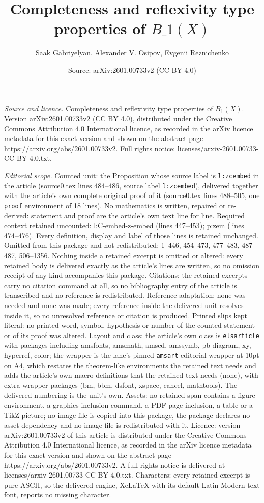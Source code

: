 \documentclass[10pt,a4paper]{amsart}
\title[Completeness and reflexivity type properties of $B\_1(X)$]{Completeness and reflexivity type properties of $B\_1(X)$}
\author{Saak Gabriyelyan, Alexander V. Osipov, Evgenii Reznichenko}
\date{Source: arXiv:2601.00733v2 (CC BY 4.0)}
\begin{document}
\maketitle

\noindent\emph{Source and licence.} Completeness and reflexivity type properties of $B_1(X)$. Version arXiv:2601.00733v2 (CC BY 4.0), distributed under the Creative Commons Attribution 4.0 International licence, as recorded in the arXiv licence metadata for this exact version and shown on the abstract page https://arxiv.org/abs/2601.00733v2. Full rights notice: licenses/arxiv-2601.00733-CC-BY-4.0.txt.\par\smallskip

\noindent\textit{Editorial scope.} Counted unit: the Proposition whose source label is \texttt{l:zcembed} in the article (source0.tex lines 484--486, source label \texttt{l:zcembed}), delivered together with the article's own complete original proof of it (source0.tex lines 488--505, one \texttt{proof} environment of 18 lines). No mathematics is written, repaired or re-derived: statement and proof are the article's own text line for line. Required context retained uncounted: l:C-embed-z-embed (lines 447--453); p:zem (lines 474--476). Every definition, display and label of those lines is retained unchanged. Omitted from this package and not redistributed: 1--446, 454--473, 477--483, 487--487, 506--1356. Nothing inside a retained excerpt is omitted or altered: every retained body is delivered exactly as the article's lines are written, so no omission receipt of any kind accompanies this package. Citations: the retained excerpts carry no citation command at all, so no bibliography entry of the article is transcribed and no reference is redistributed. Reference adaptation: none was needed and none was made; every reference inside the delivered unit resolves inside it, so no unresolved reference or citation is produced. Printed slips kept literal: no printed word, symbol, hypothesis or number of the counted statement or of its proof was altered. Layout and class: the article's own class is \texttt{elsarticle} with packages including amsfonts, amsmath, amscd, amssymb, pb-diagram, xy, hyperref, color; the wrapper is the lane's pinned \texttt{amsart} editorial wrapper at 10pt on A4, which restates the theorem-like environments the retained text needs and adds the article's own macro definitions that the retained text needs (none), with extra wrapper packages (bm, bbm, dsfont, xspace, cancel, mathtools). The delivered numbering is the unit's own. Assets: no retained span contains a figure environment, a graphics-inclusion command, a PDF-page inclusion, a table or a TikZ picture; no image file is copied into this package, the package declares no asset dependency and no image file is redistributed with it. Licence: version arXiv:2601.00733v2 of this article is distributed under the Creative Commons Attribution 4.0 International licence, as recorded in the arXiv licence metadata for this exact version and shown on the abstract page https://arxiv.org/abs/2601.00733v2. A full rights notice is delivered at licenses/arxiv-2601.00733-CC-BY-4.0.txt. Characters: every retained excerpt is pure ASCII, so the delivered engine, XeLaTeX with its default Latin Modern text font, reports no missing character.
\end{document}
